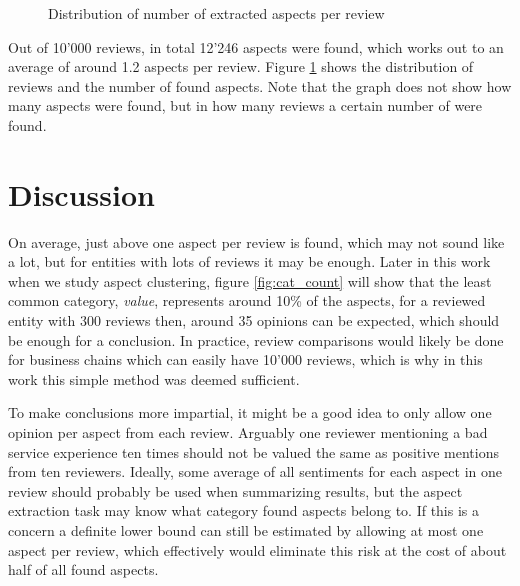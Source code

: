 \documentclass[a4paper,11pt]{kth-mag}
\begin{document}
\begin{figure}[h]
  \centering
  \caption{Distribution of number of extracted aspects per review}
  \label{fig:extr_count}
\end{figure}



Out of 10'000 reviews, in total 12'246 aspects were found, which works out to an average of around 1.2 aspects per review. Figure \ref{fig:extr_count} shows the distribution of reviews and the number of found aspects. Note that the graph does not show how many aspects were found, but in how many reviews a certain number of were found.

\section{Discussion}

On average, just above one aspect per review is found, which may not sound like a lot, but for entities with lots of reviews it may be enough. Later in this work when we study aspect clustering, figure \ref{fig:cat_count} will show that the least common category, \emph{value}, represents around 10\% of the aspects, for a reviewed entity with 300 reviews then, around 35 opinions can be expected, which should be enough for a conclusion. In practice, review comparisons would likely be done for business chains which can easily have 10'000 reviews, which is why in this work this simple method was deemed sufficient.

To make conclusions more impartial, it might be a good idea to only allow one opinion per aspect from each review. Arguably one reviewer mentioning a bad service experience ten times should not be valued the same as positive mentions from ten reviewers. Ideally, some average of all sentiments for  each aspect in one review should probably be used when summarizing results, but the aspect extraction task may know what category found aspects belong to. If this is a concern a definite lower bound can still be estimated by allowing at most one aspect per review, which effectively would eliminate this risk at the cost of about half of all found aspects.
\end{document}
